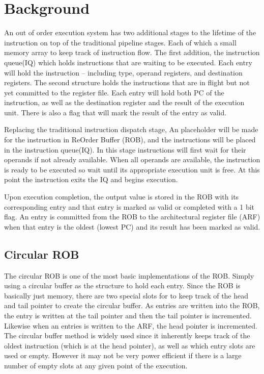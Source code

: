 \section{Background}
    An out of order execution system has two additional stages 
to the lifetime of the instruction on top of the traditional pipeline 
stages.  Each of which a small memory array to keep track of instruction flow.
The first addition, the instruction queue(IQ) which holds instructions that are 
waiting to be executed.  Each entry will hold the instruction -- including 
type, operand registers, and destination registers.  The second structure 
holds the instructions that are in flight but not yet committed to the register
file. Each entry will hold both PC of the instruction, as well as the destination
register and the result of the execution unit.  There is also a flag that will
mark the result of the entry as valid.  

Replacing the traditional instruction dispatch stage, An placeholder will be made for the
instruction in ReOrder Buffer (ROB), and the instructions will be placed
in the instruction queue(IQ). In this stage instructions will first wait for their operands if not already
available.  When all operands are available, the instruction is ready to
be executed so wait until its appropriate execution unit is free.  At this
point the instruction exits the IQ and begins execution.

Upon execution completion, the output value is stored in the ROB with its 
corresponding entry and that entry is marked as valid or completed with a 
1 bit flag.  An entry is committed from the ROB to the architectural register
file (ARF) when that entry is the oldest (lowest PC) and its result has been 
marked as valid. 
\subsection{Circular ROB}
The circular ROB is one of the most basic implementations of the ROB.  Simply using
a circular buffer as the structure to hold each entry.  Since the ROB is basically
just memory, there are two special slots for to keep track of the head and tail
pointer to create the circular buffer.  As entries are written into the ROB, the
entry is written at the tail pointer and then the tail pointer is incremented.
Likewise when an entries is written to the ARF, the head pointer is incremented.
The circular buffer method is widely used since it inherently keeps track of the 
oldest instruction (which is at the head pointer), as well as which entry slots
are used or empty.   However it may not be very power efficient if there is a large
number of empty slots at any given point of the execution.    
